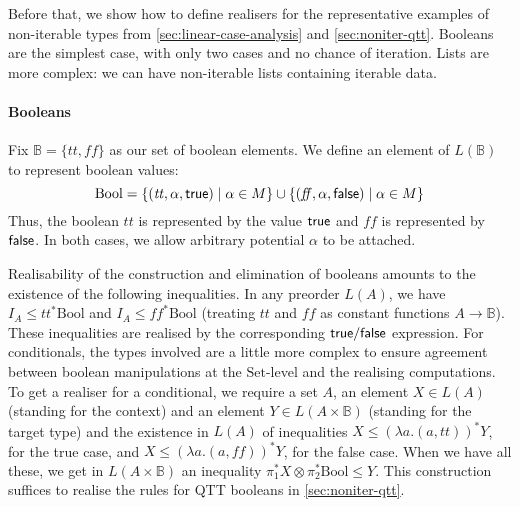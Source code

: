 \documentclass[acmsmall,screen]{acmart}
\newcommand{\Set}{\mathrm{Set}}
\begin{document}
Before that, we show how to define realisers for the representative
examples of non-iterable types from \autoref{sec:linear-case-analysis}
and \autoref{sec:noniter-qtt}. Booleans are the simplest case, with
only two cases and no chance of iteration. Lists are more complex: we
can have non-iterable lists containing iterable data.

\paragraph{Booleans} Fix $\mathbb{B} = \{ \mathit{tt}, \mathit{ff} \}$
as our set of boolean elements. We define an element of
$L(\mathbb{B})$ to represent boolean values:
\begin{displaymath}
  \mathrm{Bool} = \{ (\mathit{tt}, \alpha, \mathsf{true}) \mid \alpha \in M \} \cup \{ (\mathit{ff}, \alpha, \mathsf{false}) \mid \alpha \in M \}
\end{displaymath}
Thus, the boolean $\mathit{tt}$ is represented by the value $\mathsf{true}$
and $\mathit{ff}$ is represented by $\mathsf{false}$. In both cases, we
allow arbitrary potential $\alpha$ to be attached.

Realisability of the construction and elimination of booleans amounts
to the existence of the following inequalities. In any preorder
$L(A)$, we have $I_A \leq \mathit{tt}^* \mathrm{Bool}$ and
$I_A \leq \mathit{ff}^* \mathrm{Bool}$ (treating $\mathit{tt}$ and
$\mathit{ff}$ as constant functions $A \to \mathbb{B}$). These
inequalities are realised by the corresponding $\mathsf{true}/\mathsf{false}$
expression. For conditionals, the types involved are a little more
complex to ensure agreement between boolean manipulations at the
$\Set$-level and the realising computations. To get a realiser for a
conditional, we require a set $A$, an element $X \in L(A)$ (standing for
the context) and an element $Y \in L(A \times \mathbb{B})$ (standing
for the target type) and the existence in $L(A)$ of inequalities
$X \leq (\lambda a. (a, \mathit{tt}))^* Y$, for the true case, and
$X \leq (\lambda a. (a, \mathit{ff}))^* Y$, for the false case. When
we have all these, we get in $L(A \times \mathbb{B})$ an inequality
$\pi_1^* X \otimes \pi_2^* \mathrm{Bool} \leq Y$. This construction
suffices to realise the rules for QTT booleans in
\autoref{sec:noniter-qtt}.
\end{document}
